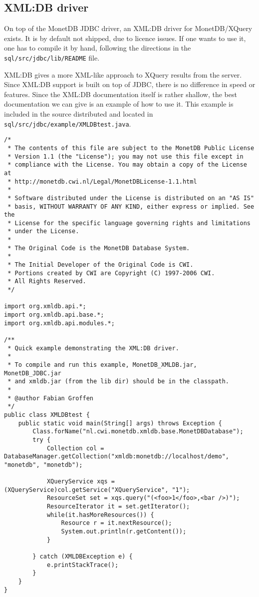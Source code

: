 \documentclass{article}
\begin{document}
\subsection{XML:DB driver}
On top of the MonetDB JDBC driver, an XML:DB driver for MonetDB/XQuery
exists.  It is by default not shipped, due to licence issues.  If one
wants to use it, one has to compile it by hand, following the directions
in the \texttt{sql/src/jdbc/lib/README} file.

XML:DB gives a more XML-like approach to XQuery results from the server.
Since XML:DB support is built on top of JDBC, there is no difference in
speed or features.  Since the XML:DB documentation itself is rather
shallow, the best documentation we can give is an example of how to use
it.  This example is included in the source distributed and located in
\texttt{sql/src/jdbc/example/XMLDBtest.java}.

\begin{verbatim}
/*
 * The contents of this file are subject to the MonetDB Public License
 * Version 1.1 (the "License"); you may not use this file except in
 * compliance with the License. You may obtain a copy of the License at
 * http://monetdb.cwi.nl/Legal/MonetDBLicense-1.1.html
 *
 * Software distributed under the License is distributed on an "AS IS"
 * basis, WITHOUT WARRANTY OF ANY KIND, either express or implied. See the
 * License for the specific language governing rights and limitations
 * under the License.
 *
 * The Original Code is the MonetDB Database System.
 *
 * The Initial Developer of the Original Code is CWI.
 * Portions created by CWI are Copyright (C) 1997-2006 CWI.
 * All Rights Reserved.
 */

import org.xmldb.api.*;
import org.xmldb.api.base.*;
import org.xmldb.api.modules.*;

/**
 * Quick example demonstrating the XML:DB driver.
 *
 * To compile and run this example, MonetDB_XMLDB.jar, MonetDB_JDBC.jar
 * and xmldb.jar (from the lib dir) should be in the classpath.
 *
 * @author Fabian Groffen
 */
public class XMLDBtest {
	public static void main(String[] args) throws Exception {
		Class.forName("nl.cwi.monetdb.xmldb.base.MonetDBDatabase");
		try {
			Collection col = DatabaseManager.getCollection("xmldb:monetdb://localhost/demo", "monetdb", "monetdb"); 

			XQueryService xqs = (XQueryService)col.getService("XQueryService", "1");
			ResourceSet set = xqs.query("(<foo>1</foo>,<bar />)");
			ResourceIterator it = set.getIterator();
			while(it.hasMoreResources()) {
				Resource r = it.nextResource();
				System.out.println(r.getContent());
			}
			
		} catch (XMLDBException e) {
			e.printStackTrace();
		}
	}
}
\end{verbatim}
\end{document}
